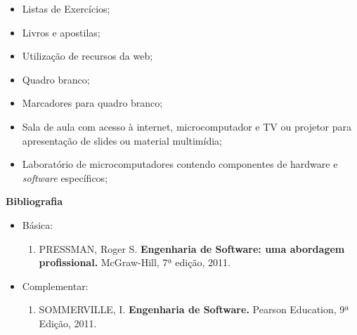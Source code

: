 \begin{itemize} 
  \item Listas de Exercícios;
    \item Livros e apostilas;
    \item Utilização de recursos da web;
    \item Quadro branco;
    \item Marcadores para quadro branco;
    \item Sala de aula com acesso à internet, microcomputador e TV ou projetor para apresentação de slides ou material multimídia;
    \item Laboratório de microcomputadores contendo componentes de hardware e \textit{software} específicos;
\end{itemize}


\begin{snugshade}\begin{center}\textbf{
    Bibliografia
}\end{center}\end{snugshade}

\begin{itemize} 
  \item Básica:
	\begin{enumerate}
	\item PRESSMAN, Roger S. \textbf{Engenharia de Software: uma abordagem profissional.} McGraw-Hill,  7ª edição, 2011.    
	\end{enumerate}
  \item Complementar:
	\begin{enumerate} 
	\item  SOMMERVILLE, I. \textbf{Engenharia de Software.} Pearson
	Education, 9ª Edição, 2011.
	\end{enumerate}
\end{itemize}
